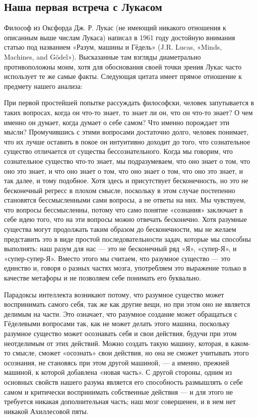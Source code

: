 \documentclass[../main.tex]{subfiles}
\begin{document}
\subsection{Наша первая встреча с Лукасом}

Философ из Оксфорда Дж. Р. Лукас (не имеющий никакого отношения к описанным выше числам Лукаса) написал в 1961 году достойную внимания статью под названием «Разум, машины и Гёдель» (J.R. Lucas, «Minds, Machines, and Gödel»). Высказанные там взгляды диаметрально противоположны моим, хотя для обоснования своей точки зрения Лукас часто использует те же самые факты. Следующая цитата имеет прямое отношение к предмету нашего анализа:

При первой простейшей попытке рассуждать философски, человек запутывается в таких вопросах, когда он что-то знает, то знает ли он, что он что-то знает? О чем именно он думает, когда думает о себе самом? Что именно порождает эти мысли? Промучившись с этими вопросами достаточно долго, человек понимает, что их лучше оставить в покое он интуитивно доходит до того, что сознательное существо отличается от существа бессознательного. Когда мы говорим, что сознательное существо что-то знает, мы подразумеваем, что оно знает о том, что оно это знает, и что оно знает о том, что оно знает о том, что оно это знает, и так далее, и тому подобное. Хотя здесь и присутствует бесконечность, но это не бесконечный регресс в плохом смысле, поскольку в этом случае постепенно становятся бессмысленными сами вопросы, а не ответы на них. Мы чувствуем, что вопросы бессмысленны, потому что само понятие «сознания» заключает в себе идею того, что на эти вопросы можно отвечать бесконечно. Хотя разумные существа могут продолжать таким образом до бесконечности, мы не желаем представить это в виде простой последовательности задач, которые мы способны выполнять: наш разум для нас --- это не бесконечный ряд «Я», «супер-Я», и «супер-супер-Я». Вместо этого мы считаем, что разумное существо --- это единство и, говоря о разных частях мозга, употребляем это выражение только в качестве метафоры и не позволяем себе понимать его буквально.

Парадоксы интеллекта возникают потому, что разумное существо может воспринимать самого себя, так же как другие вещи, но при этом оно не является делимым на части. Это означает, что разумное создание может обращаться с Гёделевыми вопросами так, как не может делать этого машина, поскольку разумное существо может осознавать себя и свои действия, будучи при этом неотделимым от этих действий. Можно создать такую машину, которая, в каком-то смысле, сможет «осознать» свои действия, но она не сможет учитывать этого осознания, не становясь при этом другой машиной, --- а именно, прежней машиной, к которой добавлена «новая часть». С другой стороны, одним из основных свойств нашего разума является его способность размышлять о себе самом и критически воспринимать собственные действия --- и для этого не требуется никакая дополнительная часть; наш мозг совершенен, и в нем нет никакой Ахиллесовой пяты.
\end{document}
